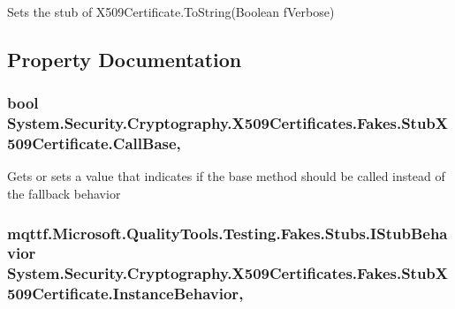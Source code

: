 Sets the stub of X509\-Certificate.\-To\-String(\-Boolean f\-Verbose)



\subsection{Property Documentation}
\hypertarget{class_system_1_1_security_1_1_cryptography_1_1_x509_certificates_1_1_fakes_1_1_stub_x509_certificate_a77f985c85d14e7029f916b784b303909}{
\subsubsection[{Call\-Base}]{\setlength{\rightskip}{0pt plus 5cm}bool System.\-Security.\-Cryptography.\-X509\-Certificates.\-Fakes.\-Stub\-X509\-Certificate.\-Call\-Base\hspace{0.3cm}{\ttfamily [get]}, {\ttfamily [set]}}}\label{class_system_1_1_security_1_1_cryptography_1_1_x509_certificates_1_1_fakes_1_1_stub_x509_certificate_a77f985c85d14e7029f916b784b303909}


Gets or sets a value that indicates if the base method should be called instead of the fallback behavior

\hypertarget{class_system_1_1_security_1_1_cryptography_1_1_x509_certificates_1_1_fakes_1_1_stub_x509_certificate_afe75f2759ace3438dc5f51c638f2e8f2}{
\subsubsection[{Instance\-Behavior}]{\setlength{\rightskip}{0pt plus 5cm}mqttf.\-Microsoft.\-Quality\-Tools.\-Testing.\-Fakes.\-Stubs.\-I\-Stub\-Behavior System.\-Security.\-Cryptography.\-X509\-Certificates.\-Fakes.\-Stub\-X509\-Certificate.\-Instance\-Behavior\hspace{0.3cm}{\ttfamily [get]}, {\ttfamily [set]}}}\label{class_system_1_1_security_1_1_cryptography_1_1_x509_certificates_1_1_fakes_1_1_stub_x509_certificate_afe75f2759ace3438dc5f51c638f2e8f2}


